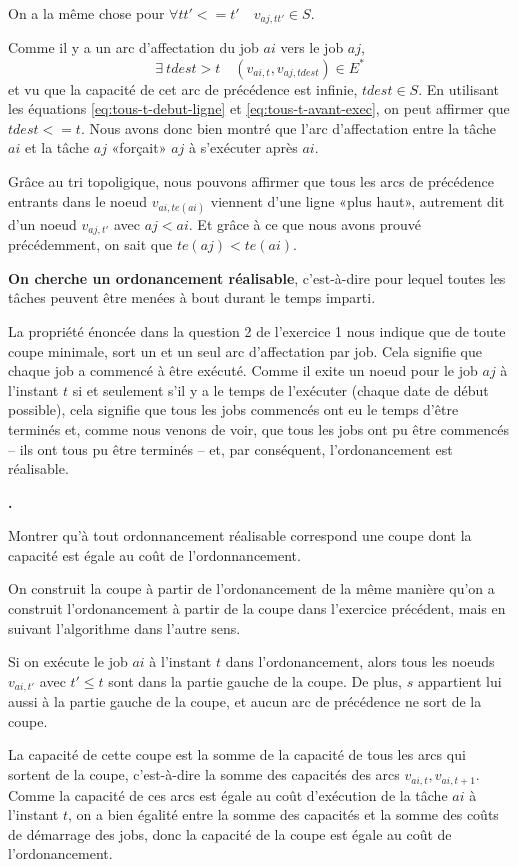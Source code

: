 \documentclass{article}
\newcounter{enoncecount}
\newenvironment{enonce}
{
\stepcounter{enoncecount}
\bf\small \arabic{enoncecount}.
\begin{bf}
}
{
\end{bf}
}
\begin{document}
On a la même chose pour $\forall tt' <= t' \quad v_{aj,tt'} \in S$.

Comme il y a un arc d'affectation du job $ai$ vers le job $aj$,
$$\exists\ {} tdest > t \quad (v_{ai,t},v_{aj,tdest}) \in E^*$$
et vu que la capacité de cet arc de précédence est infinie, $tdest \in S$. En utilisant les équations \ref{eq:tous-t-debut-ligne} et
\ref{eq:tous-t-avant-exec}, on peut affirmer que $tdest <= t$. Nous avons donc bien montré que l'arc d'affectation entre la tâche $ai$ et la
tâche $aj$ «forçait» $aj$ à s'exécuter après $ai$.

Grâce au tri topoligique, nous pouvons affirmer que tous les arcs de précédence entrants dans le noeud $v_{ai,te(ai)}$ viennent d'une ligne
«plus haut», autrement dit d'un noeud $v_{aj,t'}$ avec $aj < ai$. Et grâce à ce que nous avons prouvé précédemment,
on sait que $te(aj) < te(ai)$.

\textbf{On cherche un ordonancement réalisable}, c'est-à-dire pour lequel
toutes les tâches peuvent être menées à bout durant le temps
imparti.

La propriété énoncée dans la question 2 de l'exercice 1 nous indique que de toute coupe minimale, sort un et un seul arc d'affectation par
job. Cela signifie que chaque job a commencé à être exécuté. Comme il exite un noeud pour le job $aj$ à l'instant $t$ si et seulement s'il y
a le temps de l'exécuter ( chaque date de début possible\fg), cela signifie que tous les jobs commencés ont eu le temps d'être terminés
et, comme nous venons de voir, que tous les jobs ont pu être commencés -- ils ont tous pu être terminés -- et, par conséquent,
l'ordonancement est réalisable.

\begin{enonce}
Montrer qu'à tout ordonnancement réalisable correspond une coupe dont la capacité est égale au coût de l'ordonnancement.
\end{enonce}

On construit la coupe à partir de l'ordonancement de la même manière
qu'on a construit l'ordonancement à partir de la coupe dans l'exercice
précédent, mais en suivant l'algorithme dans l'autre sens.

Si on exécute le job $ai$ à l'instant $t$ dans l'ordonancement, alors
tous les noeuds $v_{ai,t'}$ avec $t' \leq t$ sont dans la partie \og
gauche\fg{} de la coupe. De plus, $s$ appartient lui aussi à la partie
gauche de la coupe, et aucun arc de précédence ne sort de la coupe.

La capacité de cette coupe est la somme de la capacité de tous les
arcs qui sortent de la coupe, c'est-à-dire la somme des capacités des
arcs $v_{ai,t}, v_{ai,t+1}$. Comme la capacité de ces arcs est égale au
coût d'exécution de la tâche $ai$ à l'instant $t$, on a bien égalité entre
la somme des capacités et la somme des coûts de démarrage des jobs,
donc la capacité de la coupe est égale au coût de l'ordonancement.
\end{document}
